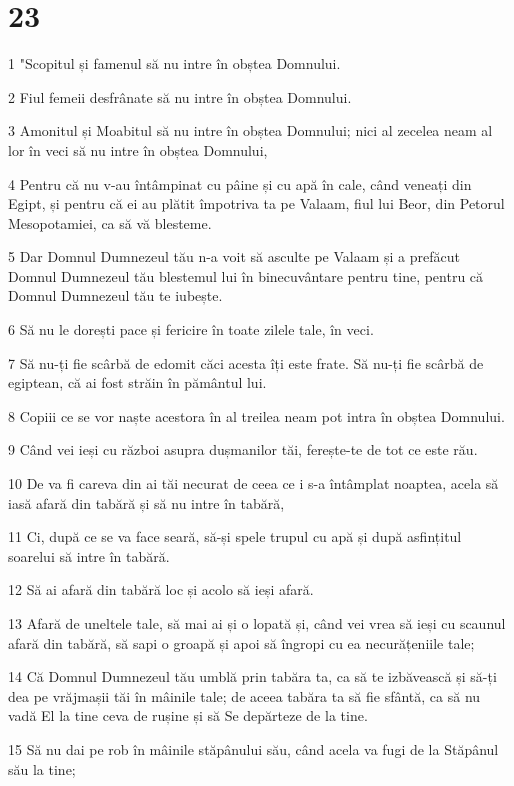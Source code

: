 \chapter{23}

\par 1 "Scopitul și famenul să nu intre în obștea Domnului.
\par 2 Fiul femeii desfrânate să nu intre în obștea Domnului.
\par 3 Amonitul și Moabitul să nu intre în obștea Domnului; nici al zecelea neam al lor în veci să nu intre în obștea Domnului,
\par 4 Pentru că nu v-au întâmpinat cu pâine și cu apă în cale, când veneați din Egipt, și pentru că ei au plătit împotriva ta pe Valaam, fiul lui Beor, din Petorul Mesopotamiei, ca să vă blesteme.
\par 5 Dar Domnul Dumnezeul tău n-a voit să asculte pe Valaam și a prefăcut Domnul Dumnezeul tău blestemul lui în binecuvântare pentru tine, pentru că Domnul Dumnezeul tău te iubește.
\par 6 Să nu le dorești pace și fericire în toate zilele tale, în veci.
\par 7 Să nu-ți fie scârbă de edomit căci acesta îți este frate. Să nu-ți fie scârbă de egiptean, că ai fost străin în pământul lui.
\par 8 Copiii ce se vor naște acestora în al treilea neam pot intra în obștea Domnului.
\par 9 Când vei ieși cu război asupra dușmanilor tăi, ferește-te de tot ce este rău.
\par 10 De va fi careva din ai tăi necurat de ceea ce i s-a întâmplat noaptea, acela să iasă afară din tabără și să nu intre în tabără,
\par 11 Ci, după ce se va face seară, să-și spele trupul cu apă și după asfințitul soarelui să intre în tabără.
\par 12 Să ai afară din tabără loc și acolo să ieși afară.
\par 13 Afară de uneltele tale, să mai ai și o lopată și, când vei vrea să ieși cu scaunul afară din tabără, să sapi o groapă și apoi să îngropi cu ea necurățeniile tale;
\par 14 Că Domnul Dumnezeul tău umblă prin tabăra ta, ca să te izbăvească și să-ți dea pe vrăjmașii tăi în mâinile tale; de aceea tabăra ta să fie sfântă, ca să nu vadă El la tine ceva de rușine și să Se depărteze de la tine.
\par 15 Să nu dai pe rob în mâinile stăpânului său, când acela va fugi de la Stăpânul său la tine;

